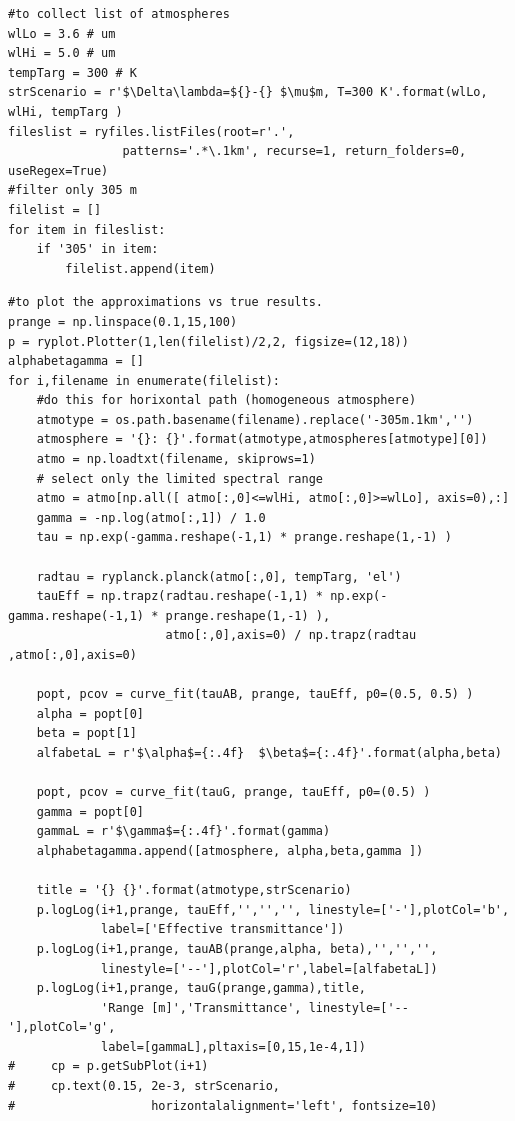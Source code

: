 \documentclass{workpackage}
\begin{document}
\begin{lstlisting}[style=incellstyle,caption={Code Listing in cell 47 \label{lst:autolistingcell47}}]
#to collect list of atmospheres
wlLo = 3.6 # um
wlHi = 5.0 # um
tempTarg = 300 # K
strScenario = r'$\Delta\lambda=${}-{} $\mu$m, T=300 K'.format(wlLo, wlHi, tempTarg )
fileslist = ryfiles.listFiles(root=r'.', 
                patterns='.*\.1km', recurse=1, return_folders=0, useRegex=True)
#filter only 305 m
filelist = []
for item in fileslist:
    if '305' in item:
        filelist.append(item)
\end{lstlisting}


\begin{lstlisting}[style=incellstyle,caption={Code Listing in cell 48 \label{lst:autolistingcell48}}]
#to plot the approximations vs true results.
prange = np.linspace(0.1,15,100)
p = ryplot.Plotter(1,len(filelist)/2,2, figsize=(12,18))
alphabetagamma = []
for i,filename in enumerate(filelist):
    #do this for horixontal path (homogeneous atmosphere)
    atmotype = os.path.basename(filename).replace('-305m.1km','')
    atmosphere = '{}: {}'.format(atmotype,atmospheres[atmotype][0])
    atmo = np.loadtxt(filename, skiprows=1)
    # select only the limited spectral range
    atmo = atmo[np.all([ atmo[:,0]<=wlHi, atmo[:,0]>=wlLo], axis=0),:]
    gamma = -np.log(atmo[:,1]) / 1.0  
    tau = np.exp(-gamma.reshape(-1,1) * prange.reshape(1,-1) )
 
    radtau = ryplanck.planck(atmo[:,0], tempTarg, 'el')
    tauEff = np.trapz(radtau.reshape(-1,1) * np.exp(-gamma.reshape(-1,1) * prange.reshape(1,-1) ),
                      atmo[:,0],axis=0) / np.trapz(radtau ,atmo[:,0],axis=0)
    
    popt, pcov = curve_fit(tauAB, prange, tauEff, p0=(0.5, 0.5) )
    alpha = popt[0]
    beta = popt[1]
    alfabetaL = r'$\alpha$={:.4f}  $\beta$={:.4f}'.format(alpha,beta)
    
    popt, pcov = curve_fit(tauG, prange, tauEff, p0=(0.5) )
    gamma = popt[0]
    gammaL = r'$\gamma$={:.4f}'.format(gamma)
    alphabetagamma.append([atmosphere, alpha,beta,gamma ])
   
    title = '{} {}'.format(atmotype,strScenario)
    p.logLog(i+1,prange, tauEff,'','','', linestyle=['-'],plotCol='b',
             label=['Effective transmittance'])
    p.logLog(i+1,prange, tauAB(prange,alpha, beta),'','','',
             linestyle=['--'],plotCol='r',label=[alfabetaL])
    p.logLog(i+1,prange, tauG(prange,gamma),title,
             'Range [m]','Transmittance', linestyle=['--'],plotCol='g',
             label=[gammaL],pltaxis=[0,15,1e-4,1])
#     cp = p.getSubPlot(i+1)
#     cp.text(0.15, 2e-3, strScenario, 
#                   horizontalalignment='left', fontsize=10)
    
\end{lstlisting}
\end{document}
